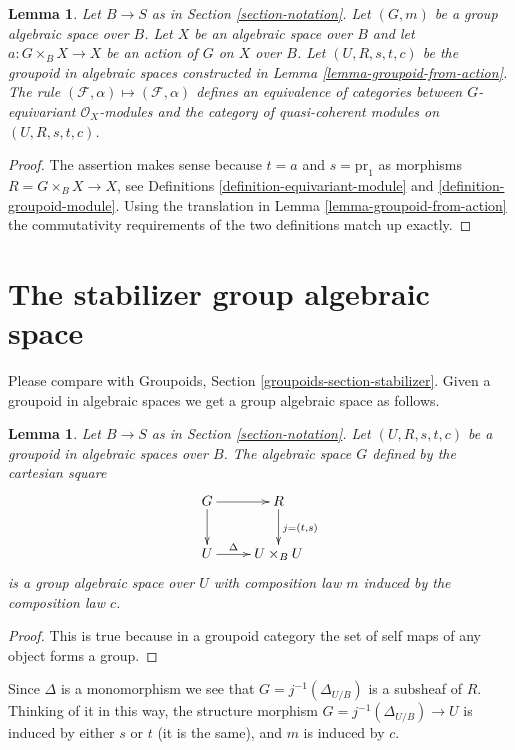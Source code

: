 \documentclass{stacks-project}
\theoremstyle{plain}
\newtheorem{lemma}[subsection]{Lemma}
\theoremstyle{definition}
\theoremstyle{remark}
\numberwithin{equation}{subsection}
\begin{document}
\begin{lemma}
\label{lemma-action-groupoid-modules}
Let $B \to S$ as in Section \ref{section-notation}.
Let $(G, m)$ be a group algebraic space over $B$.
Let $X$ be an algebraic space over $B$ and let $a : G \times_B X \to X$
be an action of $G$ on $X$ over $B$. Let $(U, R, s, t, c)$ be
the groupoid in algebraic spaces constructed in
Lemma \ref{lemma-groupoid-from-action}.
The rule
$(\mathcal{F}, \alpha) \mapsto (\mathcal{F}, \alpha)$ defines
an equivalence of categories between $G$-equivariant
$\mathcal{O}_X$-modules and the category of quasi-coherent
modules on $(U, R, s, t, c)$.
\end{lemma}

\begin{proof}
The assertion makes sense because $t = a$ and $s = \text{pr}_1$
as morphisms $R = G \times_B X \to X$, see
Definitions \ref{definition-equivariant-module} and
\ref{definition-groupoid-module}.
Using the translation in Lemma \ref{lemma-groupoid-from-action}
the commutativity requirements
of the two definitions match up exactly.
\end{proof}





\section{The stabilizer group algebraic space}
\label{section-stabilizer}

\noindent
Please compare with
Groupoids, Section \ref{groupoids-section-stabilizer}.
Given a groupoid in algebraic spaces we get a group algebraic space as follows.

\begin{lemma}
\label{lemma-groupoid-stabilizer}
Let $B \to S$ as in Section \ref{section-notation}.
Let $(U, R, s, t, c)$ be a groupoid in algebraic spaces over $B$.
The algebraic space $G$ defined by the cartesian square
$$
\xymatrix{
G \ar[r] \ar[d] & R \ar[d]^{j = (t, s)} \\
U \ar[r]^-{\Delta} & U \times_B U
}
$$
is a group algebraic space over $U$ with composition law
$m$ induced by the composition law $c$.
\end{lemma}

\begin{proof}
This is true because in a groupoid category the
set of self maps of any object forms a group.
\end{proof}

\noindent
Since $\Delta$ is a monomorphism we see that $G = j^{-1}(\Delta_{U/B})$ is a
subsheaf of $R$. Thinking of it in this way, the structure morphism
$G = j^{-1}(\Delta_{U/B}) \to U$ is induced by either $s$ or $t$
(it is the same), and $m$ is induced by $c$.
\end{document}

